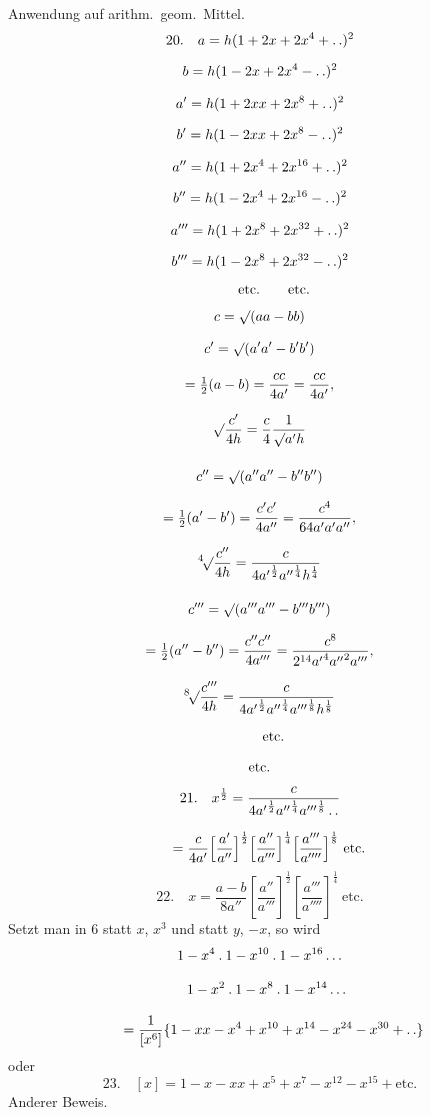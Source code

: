 Anwendung auf arithm.\ geom.\ Mittel.
\[
\begin{gathered}
20.\quad a=h(1+2x+2x^4+\mathinner{.\,.})^2\\[6pt]b=h(1-2x+2x^4-\mathinner{.\,.})^2\\[7pt]
a'=h(1+2xx+2x^8+\mathinner{.\,.})^2\\[6pt]b'=h(1-2xx+2x^8-\mathinner{.\,.})^2\\[7pt]
a''=h(1+2x^4+2x^{16}+\mathinner{.\,.})^2\\[6pt]b''=h(1-2x^4+2x^{16}-\mathinner{.\,.})^2\\[7pt]
a'''=h(1+2x^8+2x^{32}+\mathinner{.\,.})^2\\[6pt]b'''=h(1-2x^8+2x^{32}-\mathinner{.\,.})^2\\[5pt]
\qquad\mathrm{etc.}\qquad\mathrm{etc.}
\end{gathered}
\]
\[
\begin{gathered}
c=\surd(aa-bb)\\[8pt]
c'=\surd(a'a'-b'b')\\[7pt]=\tfrac12(a-b)=\dfrac{cc}{4a'}=\dfrac{cc}{4a'},
\\[7pt]\surd\dfrac{c'}{4h}=\dfrac{c}{4}\dfrac{1}{\surd a'h}\\[12pt]
c''=\surd(a''a''-b''b'')\\[7pt]=\tfrac12(a'-b')=\dfrac{c'c'}{4a''}=\dfrac{c^4}{64a'a'a''},
\\[7pt]{}^{4}\!\surd\dfrac{c''}{4h}=\dfrac{c}{4{a'}^{\frac12}{a''}^{\frac14}h^{\frac14}}\\[12pt]
c'''=\surd(a'''a'''-b'''b''')\\[7pt]=\tfrac12(a''-b'')=\dfrac{c''c''}{4a'''}=\dfrac{c^8}{2^{14}{a'}^4{a''}^2a'''},
\\[7pt]{}^{8}\!\surd\dfrac{c'''}{4h}=\dfrac{c}{4{a'}^{\frac12}{a''}^{\frac14}{a'''}^{\frac18}h^{\frac18}}\\[7pt]
\qquad\mathrm{etc.}\\[7pt]\mathrm{etc.}
\end{gathered}
\]
\[
\begin{gathered}21.\quad x^{\frac12}=\frac{c}{4{a'}^{\frac12}{a''}^{\frac14}{a'''}^{\frac18}\mathinner{.\,.}}
\\[8pt]\quad{}=\frac{c}{4a'}\Bigl[\frac{a'}{a''}\Bigr]^{\frac12}
\Bigl[\frac{a''}{a'''}\Bigr]^{\frac14}
\Bigl[\frac{a'''}{a''''}\Bigr]^{\frac18}\ \mathrm{etc.}\end{gathered}
\]
\[
22.\quad x=\frac{a-b}{8a''}\left[\frac{a''}{a'''}\right]^{\frac12}
\left[\frac{a'''}{a''''}\right]^{\frac14}\ \mathrm{etc.}
\]
Setzt man in 6 statt $x$, $x^3$ und statt $y$, $-x$, so wird
\[
\begin{gathered}
1-x^4\mathbin{.}1-x^{10}\mathbin{.}1-x^{16}\mathinner{.\,.\,.}
\\[8pt]\quad{}1-x^2\mathbin{.}1-x^8\mathbin{.}1-x^{14}\mathinner{.\,.\,.}\\[8pt]
\qquad=\frac{1}{[x^6]}\{1-xx-x^4+x^{10}+x^{14}-x^{24}-x^{30}+\mathinner{.\,.}\}
\end{gathered}
\]
oder
\[
23.\quad[x]=1-x-xx+x^5+x^7-x^{12}-x^{15}+\mathrm{etc.}
\]
Anderer Beweis.


